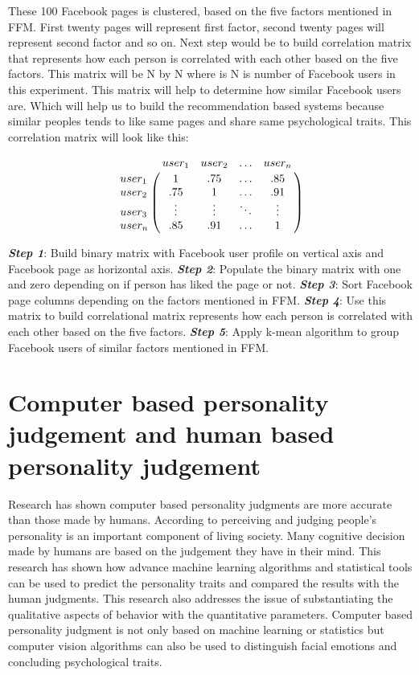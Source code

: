\documentclass[sigconf]{acmart}
\begin{document}
These 100 Facebook pages is clustered, based on the five factors mentioned in FFM. First twenty pages will represent first factor, second twenty pages will represent second factor and so on. Next step would be to build correlation matrix that represents how each person is correlated with each other based on the five factors. This matrix will be N by N where is N is number of Facebook users in this experiment. This matrix will help to determine how similar Facebook users are. Which will help us to build the recommendation based systems because similar peoples tends to like same pages and share same psychological traits. This correlation matrix will look like this:

$$\bordermatrix{\text{}&user_1 &user_2&\ldots &user_n\cr
                user_1&1 &  .75  & \ldots & .85\cr
                user_2& .75  &  1 & \ldots & .91\cr
                user_3& \vdots & \vdots & \ddots & \vdots\cr
                user_n& .85  &   .91       &\ldots & 1}$$               
                

\begin{algorithm}


\textbf{\textit{Step 1}}: Build binary matrix with Facebook user profile on vertical axis and Facebook page as horizontal axis.\newline
\textbf{\textit{Step 2}}: Populate the binary matrix with one and zero depending on if person has liked the page or not.\newline
\textbf{\textit{Step 3}}: Sort Facebook page columns depending on the factors mentioned in FFM.\newline 
\textbf{\textit{Step 4}}: Use this matrix to build correlational matrix represents how each person is correlated with each other based on the five factors.\newline
\textbf{\textit{Step 5}}: Apply k-mean algorithm to group Facebook users of similar factors mentioned in FFM. 

\end{algorithm}

\section{Computer based personality judgement and human based personality judgement}
 Research \cite{ref12} has shown computer based personality judgments are more accurate than those made by humans. According to \cite{ref12}  perceiving and judging people’s personality is an important component of living society. Many cognitive decision made by humans are based on the judgement they have in their mind. This research \cite{ref12} has shown how advance machine learning algorithms and statistical tools can be used to predict the personality traits and compared the results with the human judgments. This research also addresses the issue of substantiating the qualitative aspects of behavior with the quantitative parameters. Computer based personality judgment is not only based on machine learning or statistics but computer vision algorithms can also be used to distinguish facial emotions and concluding psychological traits. 
 
\end{document}
